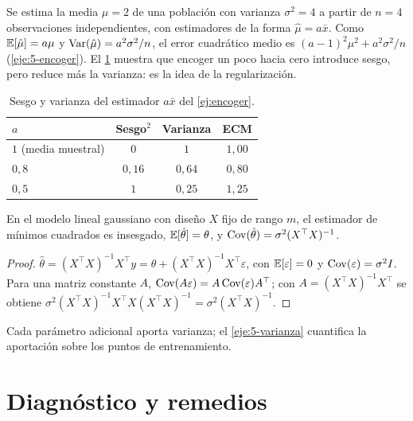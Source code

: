\begin{ejemplo}\label{ej:encoger}
Se estima la media $\mu=2$ de una población con varianza $\sigma^{2}=4$ a partir de $n=4$ observaciones independientes, con estimadores de la forma $\hat\mu=a\bar x$. Como $\mathbb{E}[\hat\mu]=a\mu$ y $\operatorname{Var}(\hat\mu)=a^{2}\sigma^{2}/n$, el error cuadrático medio es $(a-1)^{2}\mu^{2}+a^{2}\sigma^{2}/n$ (\cref{eje:5-encoger}). El \cref{tab:encoger} muestra que encoger un poco hacia cero introduce sesgo, pero reduce más la varianza: es la idea de la regularización.
\end{ejemplo}

\begin{table}[h]
\centering\small
\caption{Sesgo y varianza del estimador $a\bar x$ del \cref{ej:encoger}.}\label{tab:encoger}
\begin{tabular}{@{}lccc@{}}
\toprule
$a$ & Sesgo$^{2}$ & Varianza & ECM \\
\midrule
$1$ (media muestral) & $0$ & $1$ & $1{,}00$ \\
$0{,}8$ & $0{,}16$ & $0{,}64$ & $0{,}80$ \\
$0{,}5$ & $1$ & $0{,}25$ & $1{,}25$ \\
\bottomrule
\end{tabular}
\end{table}

\begin{proposicion}\label{prop:var-mc}
En el modelo lineal gaussiano con diseño $X$ fijo de rango $m$, el estimador de mínimos cuadrados es insesgado, $\mathbb{E}[\hat\theta]=\theta$, y $\operatorname{Cov}(\hat\theta)=\sigma^{2}(X^{\top}X)^{-1}$.
\end{proposicion}

\begin{proof}
$\hat\theta=(X^{\top}X)^{-1}X^{\top}y=\theta+(X^{\top}X)^{-1}X^{\top}\varepsilon$, con $\mathbb{E}[\varepsilon]=0$ y $\operatorname{Cov}(\varepsilon)=\sigma^{2}I$. Para una matriz constante $A$, $\operatorname{Cov}(A\varepsilon)=A\operatorname{Cov}(\varepsilon)A^{\top}$; con $A=(X^{\top}X)^{-1}X^{\top}$ se obtiene $\sigma^{2}(X^{\top}X)^{-1}X^{\top}X(X^{\top}X)^{-1}=\sigma^{2}(X^{\top}X)^{-1}$.
\end{proof}

Cada parámetro adicional aporta varianza; el \cref{eje:5-varianza} cuantifica la aportación sobre los puntos de entrenamiento.

\section{Diagnóstico y remedios}

